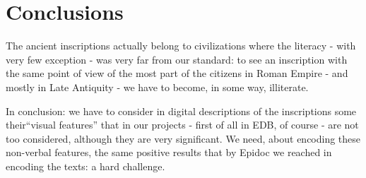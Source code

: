 \documentclass[amsthm,ebook]{saparticle}
\begin{document}
\section{Conclusions}


The ancient inscriptions actually belong to civilizations where the literacy - with very few exception - was very far
from our standard: to see an inscription with the same point of view of the most part of the citizens in Roman Empire -
and mostly in Late Antiquity - we have to become, in some way, illiterate. 

In conclusion: we have to consider in digital descriptions of the inscriptions some their``visual
features'' that in our projects - first of all in EDB, of course - are not too considered, although they
are very significant. We need, about encoding these non-verbal features, the same positive results that by Epidoc we
reached in encoding the texts: a hard challenge.



\end{document}
